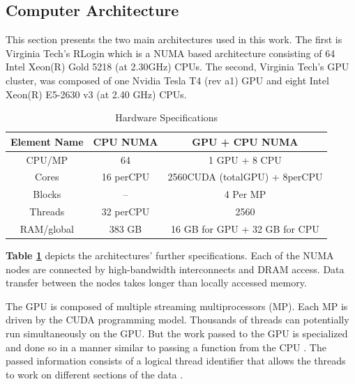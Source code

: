 \documentclass[journal]{IEEEtran}
\begin{document}
\subsection{Computer Architecture}
This section presents the two main architectures used in this work. The first is Virginia Tech's RLogin which is a NUMA based architecture consisting of 64 Intel Xeon(R) Gold 5218 (at 2.30GHz) CPUs. The second, Virginia Tech's GPU cluster, was composed of one Nvidia Tesla T4 (rev a1) GPU and eight Intel Xeon(R) E5-2630 v3 (at 2.40 GHz) CPUs. 

\begin{table}[hbt!]
\caption {Hardware Specifications} \label{tab:title}
\renewcommand{\arraystretch}{1.3}
\label{Architecture_Table}
\centering
\begin{tabular}{|c||c||c|}
\hline
\textbf{Element Name} & \textbf{CPU NUMA} & \textbf{GPU + CPU NUMA} \\
\hline
CPU/MP & 64 & 1 GPU + 8 CPU\\
\hline
Cores & 16 perCPU & 2560CUDA (totalGPU) + 8perCPU \\
\hline
Blocks & -- & 4 Per MP \\
\hline
Threads & 32 perCPU & 2560 \\
\hline
RAM/global & 383 GB & 16 GB for GPU + 32 GB for CPU \\
\hline
\end{tabular}
\label{table_hardware}
\end{table}

\textbf{Table \ref{table_hardware}} depicts the architectures' further specifications. Each of the NUMA nodes are connected by high-bandwidth interconnects and DRAM access. Data transfer between the nodes takes longer than locally accessed memory. 
\par
The GPU is composed of multiple streaming multiprocessors (MP). Each MP is driven by the CUDA programming model. Thousands of threads can potentially run simultaneously on the GPU. But the work passed to the GPU is specialized and done so in a manner similar to passing a function from the CPU \cite{Gupta2020}. The passed information consists of a logical thread identifier that allows the threads to work on different sections of the data \cite{Gupta2020}.
\end{document}
